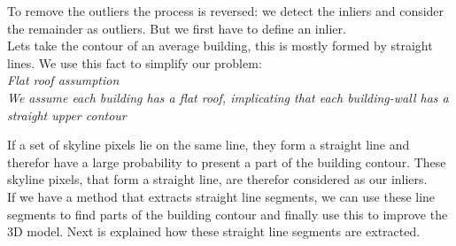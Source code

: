 \documentclass[10pt]{article}
\begin{document}

	To remove the outliers the process is reversed: we detect the
	inliers and consider the remainder as outliers. But we first have to define an inlier.\\
	Lets take the contour of an average building, this is mostly formed by
	straight lines. We use this fact to simplify our problem:\\
	\emph{Flat roof assumption}\\
	\emph{We assume each building has a flat roof, implicating that each building-wall
	has a straight upper contour}

	If a set of skyline pixels lie on the same line, they form a straight line
	and therefor have a large probability to present a part of the building contour.
	These skyline pixels, that form a straight line, are therefor considered as our
	inliers.\\ 
	If we have a method that extracts straight line segments, we can use these
	line segments to find parts of the building contour and finally use this to improve the 3D
	model. Next is explained how these straight line segments are extracted.
	
\end{document}
